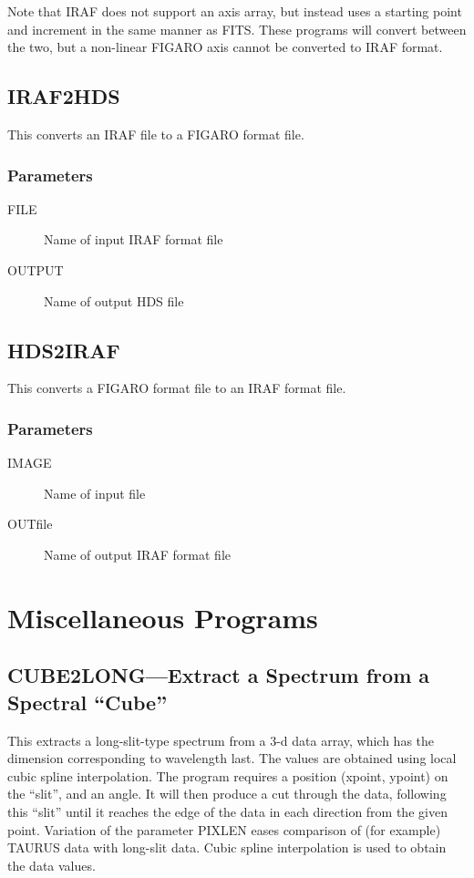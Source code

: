 Note that IRAF does not support an axis array, but instead uses a
starting point and increment in the same manner as FITS.
These programs will convert between the two, but a non-linear FIGARO
axis cannot be converted to IRAF format.

\subsection{IRAF2HDS}

This converts an IRAF file to a FIGARO format file.

\subsubsection{Parameters}

\begin{description}
\item[FILE] Name of input IRAF format file
\item[OUTPUT] Name of output HDS file
\end{description}

\subsection{HDS2IRAF}

This converts a FIGARO format file to an IRAF format file.

\subsubsection{Parameters}

\begin{description}
\item[IMAGE] Name of input file
\item[OUTfile] Name of output IRAF format file
\end{description}

\section{Miscellaneous Programs}

\subsection{CUBE2LONG---Extract a Spectrum from a Spectral ``Cube''}

This extracts a long-slit-type spectrum from a 3-d data array, which
has the dimension corresponding to wavelength last. The values are
obtained using local cubic spline interpolation. The program requires
a position (xpoint, ypoint) on the ``slit'', and an angle. It will then
produce a cut through the data, following this ``slit'' until it reaches
the edge of the data in each direction from the given point. Variation
of the parameter PIXLEN eases comparison of (for example) TAURUS data
with long-slit data. Cubic spline interpolation is used to obtain the
data values.

